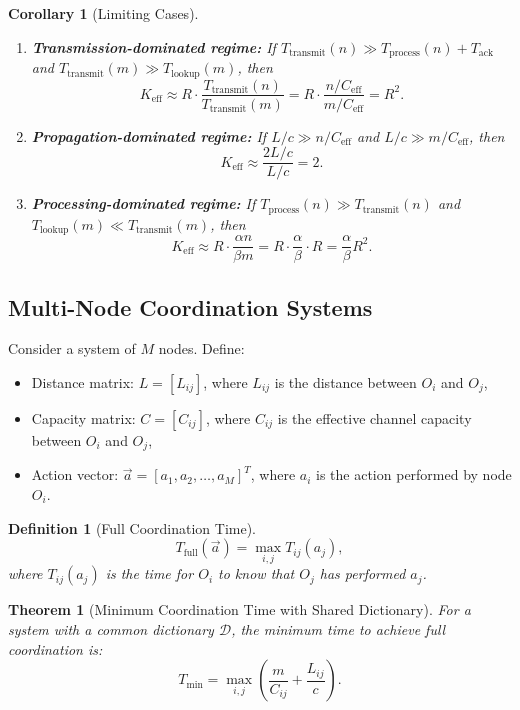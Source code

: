 \documentclass[12pt]{article}
\newtheorem{definition}{Definition}
\newtheorem{theorem}{Theorem}
\newtheorem{corollary}{Corollary}
\begin{document}
	\begin{corollary}[Limiting Cases]
		\begin{enumerate}
			\item \textbf{Transmission-dominated regime:} If $T_{\text{transmit}}(n) \gg T_{\text{process}}(n) + T_{\text{ack}}$ and $T_{\text{transmit}}(m) \gg T_{\text{lookup}}(m)$, then
			\[
			K_{\mathrm{eff}} \approx R \cdot \frac{T_{\text{transmit}}(n)}{T_{\text{transmit}}(m)} = R \cdot \frac{n/C_{\text{eff}}}{m/C_{\text{eff}}} = R^2.
			\]
			
			\item \textbf{Propagation-dominated regime:} If $L/c \gg n/C_{\text{eff}}$ and $L/c \gg m/C_{\text{eff}}$, then
			\[
			K_{\mathrm{eff}} \approx \frac{2L/c}{L/c} = 2.
			\]
			
			\item \textbf{Processing-dominated regime:} If $T_{\text{process}}(n) \gg T_{\text{transmit}}(n)$ and $T_{\text{lookup}}(m) \ll T_{\text{transmit}}(m)$, then
			\[
			K_{\mathrm{eff}} \approx R \cdot \frac{\alpha n}{\beta m} = R \cdot \frac{\alpha}{\beta} \cdot R = \frac{\alpha}{\beta} R^2.
			\]
		\end{enumerate}
	\end{corollary}
	
	\subsection{Multi-Node Coordination Systems}
	\label{app:multi-node}
	
	Consider a system of $M$ nodes. Define:
	\begin{itemize}
		\item Distance matrix: $L = [L_{ij}]$, where $L_{ij}$ is the distance between $O_i$ and $O_j$,
		\item Capacity matrix: $C = [C_{ij}]$, where $C_{ij}$ is the effective channel capacity between $O_i$ and $O_j$,
		\item Action vector: $\vec{a} = [a_1, a_2, \dots, a_M]^T$, where $a_i$ is the action performed by node $O_i$.
	\end{itemize}
	
	\begin{definition}[Full Coordination Time]
		\[
		T_{\text{full}}(\vec{a}) = \max_{i,j} T_{ij}(a_j),
		\]
		where $T_{ij}(a_j)$ is the time for $O_i$ to know that $O_j$ has performed $a_j$.
	\end{definition}
	
	\begin{theorem}[Minimum Coordination Time with Shared Dictionary]
		For a system with a common dictionary $\mathcal{D}$, the minimum time to achieve full coordination is:
		\[
		T_{\text{min}} = \max_{i,j} \left( \frac{m}{C_{ij}} + \frac{L_{ij}}{c} \right).
		\]
	\end{theorem}
	
\end{document}
